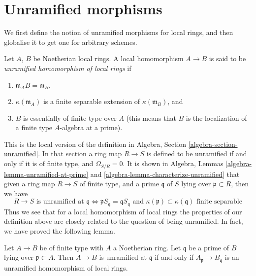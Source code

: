\section{Unramified morphisms}
\label{section-unramified-definition}

\noindent
We first define the notion of unramified morphisms for local rings, and then
globalise it to get one for arbitrary schemes.

\begin{definition}
\label{definition-unramified-rings}
Let $A$, $B$ be Noetherian local rings. A local homomorphism $A \to B$
is said to be {\it unramified homomorphism of local rings} if
\begin{enumerate}
\item $\mathfrak m_AB = \mathfrak m_B$,
\item $\kappa(\mathfrak m_A)$ is a finite separable extension of
$\kappa(\mathfrak m_B)$, and
\item $B$ is essentially of finite type over $A$ (this means
that $B$ is the localization of a finite type $A$-algebra at a prime).
\end{enumerate}
\end{definition}

\noindent
This is the local version of the
definition in Algebra, Section \ref{algebra-section-unramified}.
In that section a ring map $R \to S$ is defined to be unramified if and
only if it is of finite type, and $\Omega_{S/R} = 0$.
It is shown in
Algebra, Lemmas \ref{algebra-lemma-unramified-at-prime} and
\ref{algebra-lemma-characterize-unramified} that given a ring
map $R \to S$ of finite type, and a prime $\mathfrak q$ of $S$
lying over $\mathfrak p \subset R$, then we have
$$
R \to S\text{ is unramified at }\mathfrak q
\Leftrightarrow
\mathfrak pS_{\mathfrak q} = \mathfrak q S_{\mathfrak q}
\text{ and }
\kappa(\mathfrak p) \subset \kappa(\mathfrak q)\text{ finite separable}
$$
Thus we see that for a local homomorphism of local rings the properties
of our definition above are closely related to the question of
being unramified. In fact, we have proved the following lemma.

\begin{lemma}
\label{lemma-characterize-unramified-Noetherian}
Let $A \to B$ be of finite type with $A$ a Noetherian ring.
Let $\mathfrak q$ be a prime of $B$ lying over $\mathfrak p \subset A$.
Then $A \to B$ is unramified at $\mathfrak q$ if and only if
$A_{\mathfrak p} \to B_{\mathfrak q}$ is an unramified homomorphism
of local rings.
\end{lemma}


